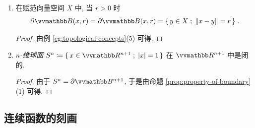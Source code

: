 \begin{example}
\begin{enumerate}
\begin{proof}
            设 \(X\) 是赋范向量空间且 \(r > 0\). 只用证明 \(\bar \B(x, r) \subseteq \overline{\B(x, r)}\). 假设 \(\overline{\B(x, r)} \subset \bar \B(x, r)\). 于是存在 \(y \in \bar \B(x, r) \backslash \overline{\B(x, r)}\). 注意到 \(d(x, y) = \|x - y\| = r > 0\), 故 \(x \neq y\). 对于任意 \(\varepsilon \in (0, 1)\), 定义
            \[
                x_\varepsilon \coloneqq x + (1 - \varepsilon) (y - x) = \varepsilon x + (1 - \varepsilon) y\ ,
            \]
            则 \(\|x - x_\varepsilon\| = (1 - \varepsilon) \|x - y\| = (1 - \varepsilon) r < r\) 且 \(\|y - x_\varepsilon\| = \varepsilon\, \|x - y\| = \varepsilon r\). 令 \((\varepsilon_k)\) 是 \((0, 1)\) 中的无穷小量. 于是 \((x_{\varepsilon_k})\) 是 \(\B(x, r)\) 中的序列且 \(x_{\varepsilon_k} \to y\). 由命题 \ref{prop:charact-of-accumulation-point-via-sequence} 可知 \(y\) 是 \(\B(x, r)\) 的闭包点, 因此 \(y \in \overline{\B(x, r)}\), 矛盾.
            \begin{center}
            \end{center}
        \end{proof}
        \item 在赋范向量空间 \(X\) 中, 当 \(r > 0\) 时
        \[
            \partial \B(x, r) = \partial \bar \B(x, r) = \{\, y \in X \;;\; \|x - y\| = r \,\}\ .
        \]
        \begin{proof}
            由例 \ref{eg:topological-concepts}(5) 可得.
        \end{proof}
        \item \textsl{\(n\)-维球面 \(S^n \coloneqq \{\, x \in \R^{n + 1} \;;\; |x| = 1 \,\}\)} 在 \(\R^{n + 1}\) 中是闭的.
        \begin{proof}
            由于 \(S^n = \partial \B^{n + 1}\), 于是由命题 \ref{prop:property-of-boundary}(1) 可得.
        \end{proof}
    \end{enumerate}
\end{example}

\subsection{连续函数的刻画}

